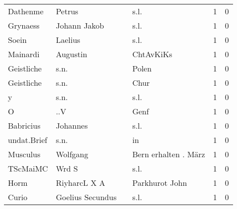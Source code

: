 \begin{center}
\begin{tiny}
\begin{longtabu}{llllrr}
                 Dathenme &                             Petrus &             &                                        s.l. &          1 &         0 \\
                 Grynaess &                       Johann Jakob &             &                                        s.l. &          1 &         0 \\
                    Soein &                            Laelius &             &                                        s.l. &          1 &         0 \\
                 Mainardi &                           Augustin &             &                                   ChtAvKiKs &          1 &         0 \\
               Geistliche &                               s.n. &             &                                       Polen &          1 &         0 \\
               Geistliche &                               s.n. &             &                                        Chur &          1 &         0 \\
                        y &                               s.n. &             &                                        s.l. &          1 &         0 \\
                        O &                                ..V &             &                                        Genf &          1 &         0 \\
                Babricius &                           Johannes &             &                                        s.l. &          1 &         0 \\
              undat.Brief &                               s.n. &             &                                          in &          1 &         0 \\
                 Musculus &                           Wolfgang &             &                        Bern erhalten . März &          1 &         0 \\
                 TScMaiMC &                              Wrd S &             &                                        s.l. &          1 &         0 \\
                     Horm &                       RiyharcL X A &             &                              Parkhurot John &          1 &         0 \\
                    Curio &                   Goelius Secundus &             &                                        s.l. &          1 &         0 \\

\end{longtabu}
\end{tiny}
\end{center}
